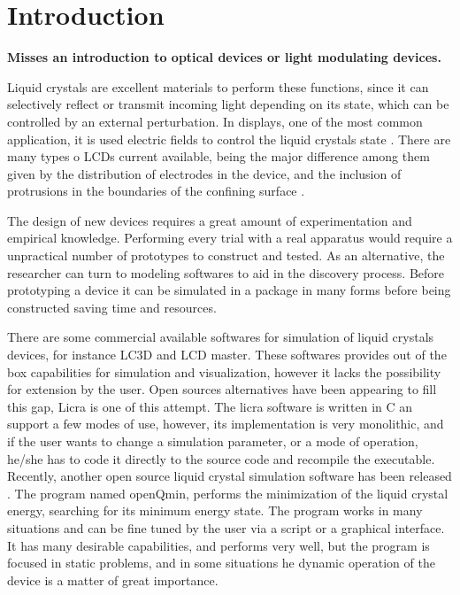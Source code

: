 \documentclass[final,5p,times,twocolumn]{elsarticle}
\begin{document}
\section{Introduction}
\label{Introduction}

\textbf{Misses an introduction to optical devices or light modulating
  devices.}

Liquid crystals are excellent materials to perform these functions,
since it can selectively reflect or transmit incoming light depending
on its state, which can be controlled by an external perturbation. In
displays, one of the most common application, it is used electric
fields to control the liquid crystals state \cite{wu2006fundamentals}.
There are many types o LCDs current available, being the major
difference among them given by the distribution of electrodes in the
device, and the inclusion of protrusions in the boundaries of the
confining surface \cite{chen2011liquid}.

The design of new devices requires a great amount of experimentation
and empirical knowledge. Performing every trial with a real apparatus
would require a unpractical number of prototypes to construct and
tested. As an alternative, the researcher can turn to modeling
softwares to aid in the discovery process. Before prototyping a device
it can be simulated in a package in many forms before being
constructed saving time and resources.

There are some commercial available softwares for simulation of liquid
crystals devices, for instance LC3D\cite{anderson2001lc3d} and LCD
master\cite{LCDMaster}. These softwares provides out of the box
capabilities for simulation and visualization, however it lacks the
possibility for extension by the user. Open sources alternatives have
been appearing to fill this gap, Licra \cite{Licra} is one of this
attempt. The licra software is written in C an support a few modes of
use, however, its implementation is very monolithic, and if the user
wants to change a simulation parameter, or a mode of operation, he/she
has to code it directly to the source code and recompile the
executable. Recently, another open source liquid crystal simulation
software has been released \cite{Sussman2019}. The program named
openQmin, performs the minimization of the liquid crystal energy,
searching for its minimum energy state. The program works in many
situations and can be fine tuned by the user via a script or a
graphical interface.  It has many desirable capabilities, and performs
very well, but the program is focused in static problems, and in some
situations he dynamic operation of the device is a matter of great
importance.
\end{document}
